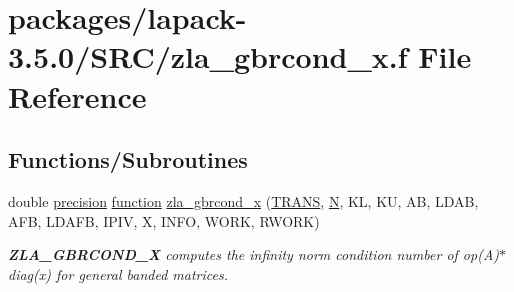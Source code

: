\hypertarget{zla__gbrcond__x_8f}{}\section{packages/lapack-\/3.5.0/\+S\+R\+C/zla\+\_\+gbrcond\+\_\+x.f File Reference}
\label{zla__gbrcond__x_8f}
\subsection*{Functions/\+Subroutines}
\begin{DoxyCompactItemize}
\item 
double \hyperlink{numinquire_8h_a2c8e616467665d0b2814d4c1589ba74e}{precision} \hyperlink{afunc_8m_a7b5e596df91eadea6c537c0825e894a7}{function} \hyperlink{group__complex16GBcomputational_ga8c57793eab444ac626d6bf86a8d0a5d6}{zla\+\_\+gbrcond\+\_\+x} (\hyperlink{superlu__enum__consts_8h_a0c4e17b2d5cea33f9991ccc6a6678d62a1f61e3015bfe0f0c2c3fda4c5a0cdf58}{T\+R\+A\+N\+S}, \hyperlink{polmisc_8c_a0240ac851181b84ac374872dc5434ee4}{N}, K\+L, K\+U, A\+B, L\+D\+A\+B, A\+F\+B, L\+D\+A\+F\+B, I\+P\+I\+V, X, I\+N\+F\+O, W\+O\+R\+K, R\+W\+O\+R\+K)
\begin{DoxyCompactList}\small\item\em {\bfseries Z\+L\+A\+\_\+\+G\+B\+R\+C\+O\+N\+D\+\_\+\+X} computes the infinity norm condition number of op(\+A)$\ast$diag(x) for general banded matrices. \end{DoxyCompactList}\end{DoxyCompactItemize}
